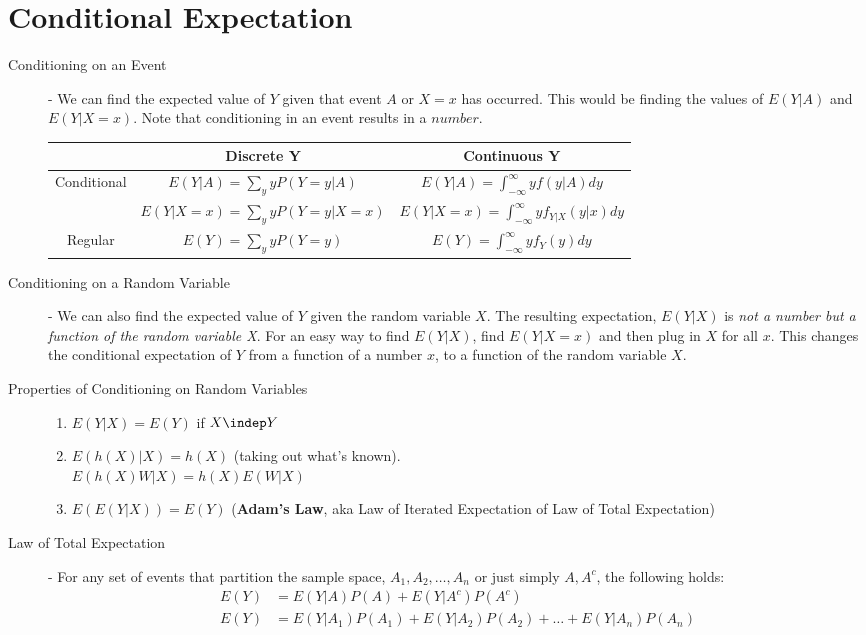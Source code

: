 \documentclass[11pt]{article}
\begin{document}
\section*{Conditional Expectation}
\begin{description}
  \item[Conditioning on an Event] - We can find the expected value of $Y$ given that event $A$ or $X=x$ has occurred. This would be finding the values of $E(Y|A)$ and $E(Y|X = x)$. Note that conditioning in an event results in a $number$.
    \begin{table}[htb!]
       \centering
      \begin{tabular}{ccc}
      \toprule
         ~& \textbf{Discrete Y} & \textbf{Continuous Y} \\
      \midrule
         Conditional & $E(Y|A) = \sum_y yP(Y=y|A)$ & $E(Y|A) = \int_{-\infty}^\infty yf(y|A)dy$ \\
         ~ & $E(Y|X=x) = \sum_y yP(Y=y|X=x)$ & $E(Y|X=x) =\int_{-\infty}^\infty yf_{Y|X}(y|x)dy$ \\
      \midrule
      Regular & $E(Y) = \sum_y yP(Y=y)$ & $E(Y) =\int_{-\infty}^\infty yf_Y(y)dy$ \\

      \bottomrule
      \end{tabular}
    \end{table}
  \vspace{-.45 cm}
  \item[Conditioning on a Random Variable] - We can also find the expected value of $Y$ given the random variable $X$. The resulting expectation, $E(Y|X)$ is \emph{not a number but a function of the random variable X}. For an easy way to find $E(Y|X)$, find $E(Y|X = x)$ and then plug in $X$ for all $x$. This changes the conditional expectation of $Y$ from a function of a number $x$, to a function of the random variable $X$.
  \item[Properties of Conditioning on Random Variables] \quad
  \begin{enumerate}
    \item $E(Y|X) = E(Y)$ if $X \indep Y$
    \item $E(h(X)|X) = h(X)$ (taking out what's known). \\
      $E(h(X)W|X) = h(X)E(W|X)$
    \item $E(E(Y|X)) = E(Y)$ (\textbf{Adam's Law}, aka Law of Iterated Expectation of Law of Total Expectation)
  \end{enumerate}

  \item[Law of Total Expectation] - For any set of events that partition the sample space, $A_1, A_2, \dots, A_n$ or just simply $A, A^c$, the following holds:
  \begin{align*}
    E(Y) &= E(Y|A)P(A) + E(Y|A^c)P(A^c) \\
    E(Y) &= E(Y|A_1)P(A_1) + E(Y|A_2)P(A_2) + \dots + E(Y|A_n)P(A_n)
  \end{align*}
\end{description}
\end{document}
